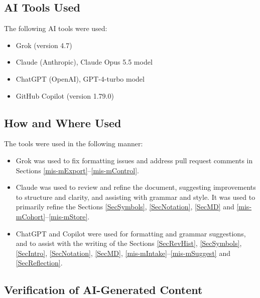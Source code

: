 \documentclass[12pt, titlepage]{article}
\begin{document}

\subsection{AI Tools Used}

The following AI tools were used:
\begin{itemize}
    \item Grok (version 4.7)
    \item Claude (Anthropic), Claude Opus 5.5 model
    \item ChatGPT (OpenAI), GPT-4-turbo model
    \item GitHub Copilot (version 1.79.0)
\end{itemize}
\subsection{How and Where Used}

The tools were used in the following manner:
\begin{itemize}
    \item Grok was used to fix formatting issues and address pull request comments
    in Sections \ref{mis-mExport}--\ref{mis-mControl}.
    \item Claude was used to review and refine the document, suggesting
    improvements to structure and clarity, and assisting with grammar and style. It
    was used to primarily refine the Sections \ref{SecSymbols}, \ref{SecNotation}, \ref{SecMD} and \ref{mis-mCohort}--\ref{mis-mStore}.
    \item ChatGPT and Copilot were used for formatting and grammar suggestions, and
    to assist with the writing of the Sections \ref{SecRevHist}, \ref{SecSymbols}, \ref{SecIntro}, \ref{SecNotation}, \ref{SecMD}, \ref{mis-mIntake}--\ref{mis-mSuggest} and \ref{SecReflection}.
\end{itemize}

\subsection{Verification of AI-Generated Content}
\end{document}
